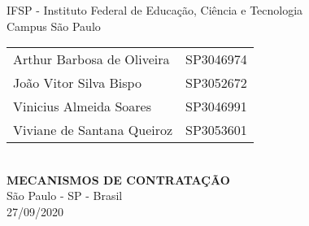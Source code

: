 
\thispagestyle{empty}
\begin{center}
{\Large IFSP - Instituto Federal de Educação, Ciência e Tecnologia \\  Campus São Paulo\\}
\vspace{2cm}
{\large
\begin{tabular}{lr}

Arthur Barbosa de Oliveira & SP3046974 \\
João Vitor Silva Bispo & SP3052672 \\
Vinicius Almeida Soares & SP3046991 \\
Viviane de Santana Queiroz & SP3053601 \\

\end{tabular}}
\vspace{6cm}\\
{\Large \bfseries  MECANISMOS DE CONTRATAÇÃO}\\
\vspace{4cm}
{\large São Paulo - SP - Brasil}\\
\vspace{1cm}
{\large 27/09/2020}


\end{center}

